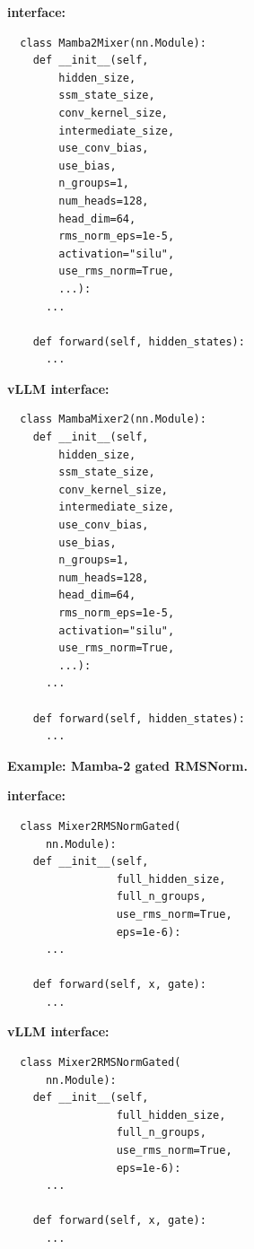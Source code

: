   \noindent
  \begin{minipage}[t]{0.48\linewidth}
  \vspace{0pt}
  \textbf{\fastkernels{} interface:}
  \begin{lstlisting}
  class Mamba2Mixer(nn.Module):
    def __init__(self,
        hidden_size,
        ssm_state_size,
        conv_kernel_size,
        intermediate_size,
        use_conv_bias,
        use_bias,
        n_groups=1,
        num_heads=128,
        head_dim=64,
        rms_norm_eps=1e-5,
        activation="silu",
        use_rms_norm=True,
        ...):
      ...

    def forward(self, hidden_states):
      ...
  \end{lstlisting}
  \end{minipage}
  \hfill
  \begin{minipage}[t]{0.48\linewidth}
  \vspace{0pt}
  \textbf{vLLM interface:}
  \begin{lstlisting}
  class MambaMixer2(nn.Module):
    def __init__(self,
        hidden_size,
        ssm_state_size,
        conv_kernel_size,
        intermediate_size,
        use_conv_bias,
        use_bias,
        n_groups=1,
        num_heads=128,
        head_dim=64,
        rms_norm_eps=1e-5,
        activation="silu",
        use_rms_norm=True,
        ...):
      ...

    def forward(self, hidden_states):
      ...
  \end{lstlisting}
  \end{minipage}

  \medskip


  \noindent\textbf{Example: Mamba-2 gated RMSNorm.}

  \noindent
  \begin{minipage}[t]{0.48\linewidth}
  \vspace{0pt}
  \textbf{\fastkernels{} interface:}
  \begin{lstlisting}
  class Mixer2RMSNormGated(
      nn.Module):
    def __init__(self,
                 full_hidden_size,
                 full_n_groups,
                 use_rms_norm=True,
                 eps=1e-6):
      ...

    def forward(self, x, gate):
      ...
  \end{lstlisting}
  \end{minipage}
  \hfill
  \begin{minipage}[t]{0.48\linewidth}
  \vspace{0pt}
  \textbf{vLLM interface:}
  \begin{lstlisting}
  class Mixer2RMSNormGated(
      nn.Module):
    def __init__(self,
                 full_hidden_size,
                 full_n_groups,
                 use_rms_norm=True,
                 eps=1e-6):
      ...

    def forward(self, x, gate):
      ...
  \end{lstlisting}
  \end{minipage}

